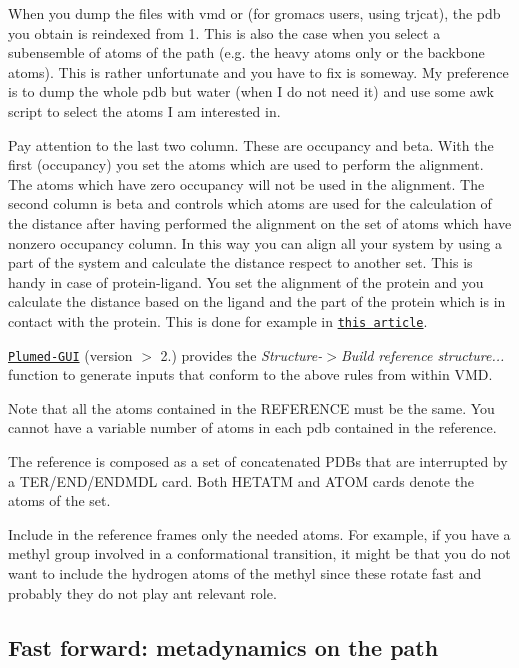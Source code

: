 \begin{DoxyItemize}
\item When you dump the files with vmd or (for gromacs users, using trjcat), the pdb you obtain is reindexed from 1. This is also the case when you select a subensemble of atoms of the path (e.\+g. the heavy atoms only or the backbone atoms). This is rather unfortunate and you have to fix is someway. My preference is to dump the whole pdb but water (when I do not need it) and use some awk script to select the atoms I am interested in.
\item Pay attention to the last two column. These are occupancy and beta. With the first (occupancy) you set the atoms which are used to perform the alignment. The atoms which have zero occupancy will not be used in the alignment. The second column is beta and controls which atoms are used for the calculation of the distance after having performed the alignment on the set of atoms which have nonzero occupancy column. In this way you can align all your system by using a part of the system and calculate the distance respect to another set. This is handy in case of protein-\/ligand. You set the alignment of the protein and you calculate the distance based on the ligand and the part of the protein which is in contact with the protein. This is done for example in \href{http://pubs.acs.org/doi/abs/10.1021/jp911689r}{\tt this article}.
\item \href{http://www.multiscalelab.org/utilities/PlumedGUI}{\tt Plumed-\/\+G\+U\+I} (version $>$ 2.) provides the {\itshape Structure-\/$>$Build reference structure...} function to generate inputs that conform to the above rules from within V\+M\+D.
\item Note that all the atoms contained in the R\+E\+F\+E\+R\+E\+N\+C\+E must be the same. You cannot have a variable number of atoms in each pdb contained in the reference.
\item The reference is composed as a set of concatenated P\+D\+Bs that are interrupted by a T\+E\+R/\+E\+N\+D/\+E\+N\+D\+M\+D\+L card. Both H\+E\+T\+A\+T\+M and A\+T\+O\+M cards denote the atoms of the set.
\item Include in the reference frames only the needed atoms. For example, if you have a methyl group involved in a conformational transition, it might be that you do not want to include the hydrogen atoms of the methyl since these rotate fast and probably they do not play ant relevant role.
\end{DoxyItemize}\hypertarget{belfast-2_belfast-2-pcvs-metad-on-path}{}\subsection{Fast forward\+: metadynamics on the path}\label{belfast-2_belfast-2-pcvs-metad-on-path}
